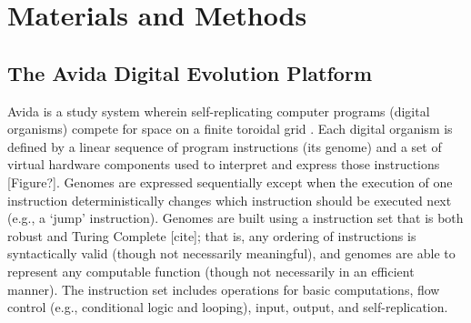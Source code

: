 

\section{Materials and Methods}

\subsection{The Avida Digital Evolution Platform}


Avida is a study system wherein self-replicating computer programs (digital organisms) compete for space on a finite toroidal grid \citep{ofria_avida:_2009}. 
Each digital organism is defined by a linear sequence of program instructions (its genome) and a set of virtual hardware components used to interpret and express those instructions [Figure?].
Genomes are expressed sequentially except when the execution of one instruction deterministically changes which instruction should be executed next (e.g., a `jump' instruction).   
Genomes are built using a instruction set that is both robust and Turing Complete [cite]; that is, any ordering of instructions is syntactically valid (though not necessarily meaningful), and genomes are able to represent any computable function (though not necessarily in an efficient manner).
The instruction set includes operations for basic computations, flow control (e.g., conditional logic and looping), input, output, and self-replication.

